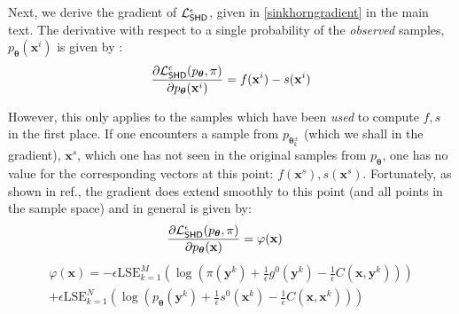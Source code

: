 Next, we derive the gradient of $\mathcal{L}^\epsilon_{\operatorname{\textsf{SHD}}}$, given in \eqref{sinkhorngradient} in the main text. The derivative with respect to a single probability of the \textit{observed} samples, $p_{\boldsymbol\theta}(\mathbf{x}^i)$ is given by :
\begin{align}
    \frac{\partial \mathcal{L}_{\operatorname{\textsf{SHD}}}^\epsilon(p_{\boldsymbol\theta}, \pi)}{\partial p_{\boldsymbol\theta}(\mathbf{x}^i)} = f(\mathbf{x}^i) - s(\mathbf{x}^i)
\end{align}



\noindent However, this only applies to the samples which have been \textit{used} to compute $f, s$ in the first place. If one encounters a sample from $p_{{\boldsymbol\theta}_k^{\pm}}$ (which we shall in the gradient), $\mathbf{x}^s$, which one has not seen in the original samples from $p_{\boldsymbol\theta}$, one has no value for the corresponding vectors at this point: $f(\mathbf{x}^s), s(\mathbf{x}^s)$. Fortunately, as shown in ref., the gradient does extend smoothly to this point (and all points in the sample space) and in general is given by:
\begin{align}
    \frac{\partial \mathcal{L}_{\operatorname{\textsf{SHD}}}^\epsilon(p_{\boldsymbol\theta}, \pi)}{\partial p_{\boldsymbol\theta}(\mathbf{x})} &= \varphi(\mathbf{x}) 
\end{align}
\begin{multline}
    \varphi(\mathbf{x}) = -\epsilon \text{LSE}_{k=1}^M\left(\log\left(\pi(\mathbf{\mathbf{y}}^k) + \frac{1}{\epsilon}g^{0}(\mathbf{y}^k) - \frac{1}{\epsilon} C(\mathbf{x}, \mathbf{y}^k)\right)\right)\\
    + \epsilon \text{LSE}_{k=1}^N\left(\log\left(p_{\boldsymbol\theta}(\mathbf{y}^k) + \frac{1}{\epsilon}s^{0}(\mathbf{x}^k) - \frac{1}{\epsilon} C(\mathbf{x}, \mathbf{x}^k)\right)\right)
\end{multline}



